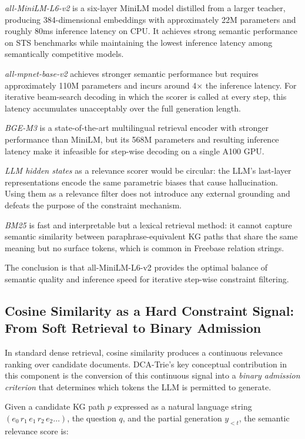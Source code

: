 \noindent \textit{all-MiniLM-L6-v2} \citep{reimers2019sentence} is a six-layer
MiniLM model distilled from a larger teacher, producing 384-dimensional
embeddings with approximately 22M parameters and roughly 80ms inference latency
on CPU. It achieves strong semantic performance on STS benchmarks while
maintaining the lowest inference latency among semantically competitive models.

\noindent \textit{all-mpnet-base-v2} achieves stronger semantic performance but
requires approximately 110M parameters and incurs around 4× the inference
latency. For iterative beam-search decoding in which the scorer is called at
every step, this latency accumulates unacceptably over the full generation
length.

\noindent \textit{BGE-M3} \citep{chen2024bge} is a state-of-the-art multilingual
retrieval encoder with stronger performance than MiniLM, but its 568M parameters
and resulting inference latency make it infeasible for step-wise decoding on a
single A100 GPU.

\noindent \textit{LLM hidden states} as a relevance scorer would be circular:
the LLM's last-layer representations encode the same parametric biases that cause
hallucination. Using them as a relevance filter does not introduce any external
grounding and defeats the purpose of the constraint mechanism.

\noindent \textit{BM25} is fast and interpretable but a lexical retrieval
method: it cannot capture semantic similarity between paraphrase-equivalent KG
paths that share the same meaning but no surface tokens, which is common in
Freebase relation strings.

The conclusion is that all-MiniLM-L6-v2 provides the optimal balance of
semantic quality and inference speed for iterative step-wise constraint
filtering.

\subsection{Cosine Similarity as a Hard Constraint Signal: From Soft Retrieval
    to Binary Admission}

In standard dense retrieval, cosine similarity produces a continuous relevance
ranking over candidate documents. DCA-Trie's key conceptual contribution in this
component is the conversion of this continuous signal into a \textit{binary
    admission criterion} that determines which tokens the LLM is permitted to
generate.

Given a candidate KG path $p$ expressed as a natural language string
$(e_0 \, r_1 \, e_1 \, r_2 \, e_2 \ldots)$, the question $q$, and the partial
generation $y_{<t}$, the semantic relevance score is:


